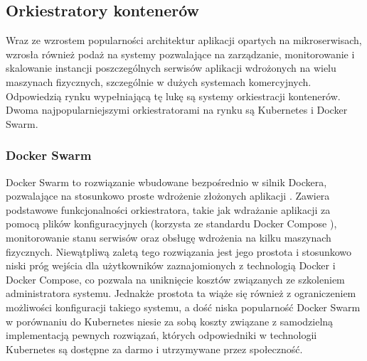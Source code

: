 \subsection{Orkiestratory kontenerów}
Wraz ze wzrostem popularności architektur aplikacji opartych na mikroserwisach, wzrosła również podaż na systemy pozwalające na zarządzanie, monitorowanie i skalowanie instancji poszczególnych serwisów aplikacji wdrożonych na wielu maszynach fizycznych, szczególnie w dużych systemach komercyjnych. Odpowiedzią rynku wypełniającą tę lukę są systemy orkiestracji kontenerów. Dwoma najpopularniejszymi orkiestratorami na rynku są Kubernetes i Docker Swarm.

\subsubsection{Docker Swarm}
Docker Swarm to rozwiązanie wbudowane bezpośrednio w silnik Dockera, pozwalające na stosunkowo proste wdrożenie złożonych aplikacji \cite{dockerSwarm}. Zawiera podstawowe funkcjonalności orkiestratora, takie jak wdrażanie aplikacji za pomocą plików konfiguracyjnych (korzysta ze standardu Docker Compose \cite{dockerCompose}), monitorowanie stanu serwisów oraz obsługę wdrożenia na kilku maszynach fizycznych. Niewątpliwą zaletą tego rozwiązania jest jego prostota i stosunkowo niski próg wejścia dla użytkowników zaznajomionych z technologią Docker i Docker Compose, co pozwala na uniknięcie kosztów związanych ze szkoleniem administratora systemu. Jednakże prostota ta wiąże się również z ograniczeniem możliwości konfiguracji takiego systemu, a dość niska popularność Docker Swarm w porównaniu do Kubernetes niesie za sobą koszty związane z samodzielną implementacją pewnych rozwiązań, których odpowiedniki w technologii Kubernetes są dostępne za darmo i utrzymywane przez społeczność.
